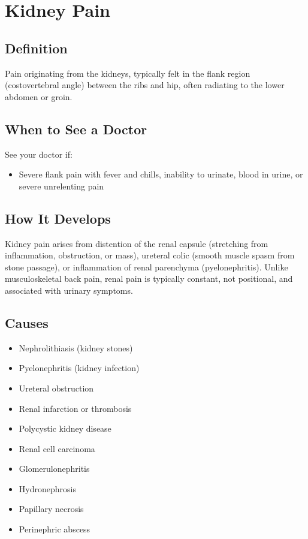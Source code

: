 \chapter{Kidney Pain}

\section*{Definition}
Pain originating from the kidneys, typically felt in the flank region (costovertebral angle) between the ribs and hip, often radiating to the lower abdomen or groin.

\section*{When to See a Doctor}
See your doctor if:
\begin{itemize}
  \item Severe flank pain with fever and chills, inability to urinate, blood in urine, or severe unrelenting pain
\end{itemize}

\section*{How It Develops}
Kidney pain arises from distention of the renal capsule (stretching from inflammation, obstruction, or mass), ureteral colic (smooth muscle spasm from stone passage), or inflammation of renal parenchyma (pyelonephritis). Unlike musculoskeletal back pain, renal pain is typically constant, not positional, and associated with urinary symptoms.

\section*{Causes}
\begin{itemize}
  \item Nephrolithiasis (kidney stones)
  \item Pyelonephritis (kidney infection)
  \item Ureteral obstruction
  \item Renal infarction or thrombosis
  \item Polycystic kidney disease
  \item Renal cell carcinoma
  \item Glomerulonephritis
  \item Hydronephrosis
  \item Papillary necrosis
  \item Perinephric abscess
\end{itemize}


